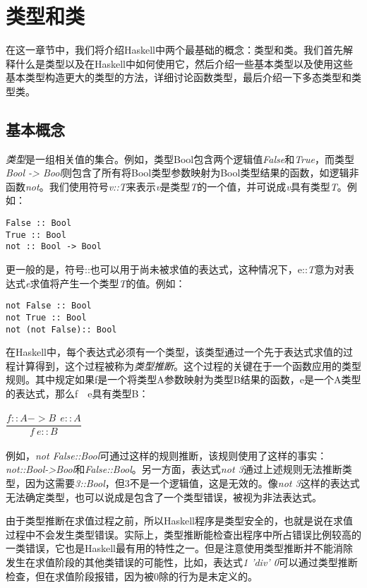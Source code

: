 
\chapter{类型和类}
在这一章节中，我们将介绍Haskell中两个最基础的概念：类型和类。我们首先解释什么是类型以及在Haskell中如何使用它，然后介绍一些基本类型以及使用这些基本类型构造更大的类型的方法，详细讨论函数类型，最后介绍一下多态类型和类型类。

\section{基本概念}
\textit{类型}是一组相关值的集合。例如，类型Bool包含两个逻辑值\textit{False}和\textit{True}，而类型\textit{Bool
->
Bool}则包含了所有将Bool类型参数映射为Bool类型结果的函数，如逻辑非函数\textit{not}。我们使用符号\textit{v::T}来表示\textit{v}是类型\textit{T}的一个值，并可说成\textit{v}具有类型\textit{T}。例如：

\begin{verbatim}
False :: Bool
True :: Bool
not :: Bool -> Bool
\end{verbatim}

更一般的是，符号::也可以用于尚未被求值的表达式，这种情况下，e::\textit{T}意为对表达式\textit{e}求值将产生一个类型\textit{T}的值。例如：

\begin{verbatim}
not False :: Bool
not True :: Bool
not (not False):: Bool
\end{verbatim}

在Haskell中，每个表达式必须有一个类型，该类型通过一个先于表达式求值的过程计算得到，这个过程被称为\textit{类型推断}。这个过程的关键在于一个函数应用的类型规则。其中规定如果f是一个将类型A参数映射为类型B结果的函数，e是一个A类型的表达式，那么f~~e具有类型B：\\
\\
$\dfrac{f::A->B~~e::A}{f~e::B}$
\\
\\
例如，\textit{not False::Bool}可通过这样的规则推断，该规则使用了这样的事实：\textit{not::Bool->Bool}和\textit{False::Bool}。另一方面，表达式\textit{not 3}通过上述规则无法推断类型，因为这需要\textit{3::Bool}，但3不是一个逻辑值，这是无效的。像\textit{not 3}这样的表达式无法确定类型，也可以说成是包含了一个类型错误，被视为非法表达式。

由于类型推断在求值过程之前，所以Haskell程序是类型安全的，也就是说在求值过程中不会发生类型错误。实际上，类型推断能检查出程序中所占错误比例较高的一类错误，它也是Haskell最有用的特性之一。但是注意使用类型推断并不能消除发生在求值阶段的其他类错误的可能性，比如，表达式\textit{1
'div' 0}可以通过类型推断检查，但在求值阶段报错，因为被0除的行为是未定义的。

